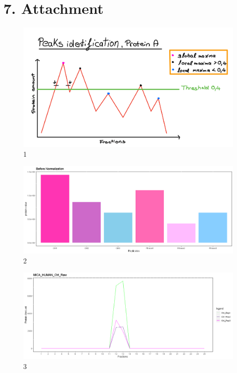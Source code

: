 \documentclass[
]{article}
\begin{document}
\hypertarget{attachment}{%
\section{7. Attachment}\label{attachment}}

\begin{figure}
\centering
\includegraphics{../results/png/Peaks_identification_bild.png}
\caption{1}
\end{figure}

\begin{figure}
\centering
\includegraphics{../results/png/Before_Norm.png}
\caption{2}
\end{figure}

\begin{figure}
\centering
\includegraphics{../results/png/Ctrl_Raw.png}
\caption{3}
\end{figure}
\end{document}
